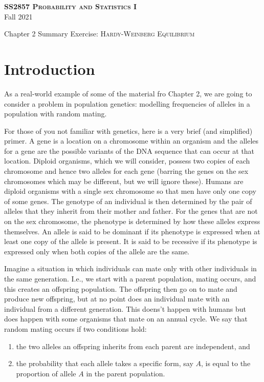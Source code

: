 \documentclass[addpoints,answers]{exam}
\begin{document}
\begin{center}
  \Large{\textsc{\textbf{SS2857 Probability and Statistics I}}}\\
  \Large{Fall 2021}

  \bigskip
  
  \large{Chapter 2 Summary Exercise: \textsc{Hardy-Weinberg Equilibrium}}

\end{center}

\section{Introduction}

As a real-world example of some of the material fro Chapter 2, we are going to consider a problem in population genetics: modelling frequencies of alleles in a population with random mating. 

For those of you not familiar with genetics, here is a very brief (and simplified) primer. A gene is a location on a chromosome within an organism and the alleles for a gene are the possible variants of the DNA sequence that can occur at that location. Diploid organisms, which we will consider, possess two copies of each chromosome and hence two alleles for each gene (barring the genes on the sex chromosomes which may be different, but we will ignore these). Humans are diploid organisms with a single sex chromosome so that men have only one copy of some genes. The genotype of an individual is then determined by the pair of alleles that they inherit from their mother and father. For the genes that are not on the sex chromosome, the phenotype is determined by how these alleles express themselves. An allele is said to be dominant if its phenotype is expressed when at least one copy of the allele is present. It is said to be recessive if its phenotype is expressed only when both copies of the allele are the same.

Imagine a situation in which individuals can mate only with other individuals in the same generation. I.e., we start with a parent population, mating occurs, and this creates an offspring population. The offspring then go on to mate and produce new offspring, but at no point does an individual mate with an individual from a different generation. This doens't happen with humans but does happen with some organisms that mate on an annual cycle. We say that random mating occurs if two conditions hold:
\begin{enumerate}
\item the two alleles an offspring inherits from each parent are independent, and 
\item the probability that each allele takes a specific form, say $A$, is equal to the proportion of allele $A$ in the parent population.
\end{enumerate}
\end{document}
